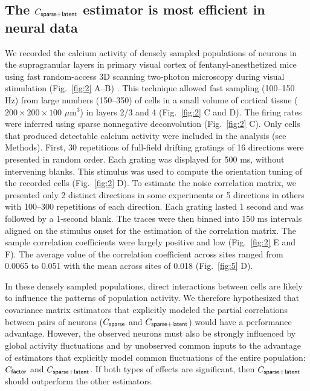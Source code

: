 \subsection*{The $C_{\sf sparse+latent}$ estimator is most efficient in neural data}
We recorded the calcium activity of densely sampled populations of neurons in the supragranular layers in primary visual cortex of fentanyl-anesthetized mice using fast random-access 3D scanning two-photon microscopy during visual stimulation (Fig.~\ref{fig:2} A--B) \cite{Reddy:2005, Katona:2012, Cotton:2013}. This technique allowed fast sampling (100--150 Hz) from large numbers (150--350) of cells in a small volume of cortical tissue ($200\times200\times100$ $\mu$m$^3$) in layers 2/3 and 4 (Fig.~\ref{fig:2} C and D).  The firing rates were inferred using sparse nonnegative deconvolution \cite{Vogelstein:2010} (Fig.~\ref{fig:2} C). Only cells that produced detectable calcium activity were included in the analysis (see Methods).  First, 30 repetitions of full-field drifting gratings of 16 directions were presented in random order.  Each grating was displayed for 500 ms, without intervening blanks.  This stimulus was used to compute the orientation tuning of the recorded cells (Fig.~\ref{fig:2} D). To estimate the noise correlation matrix, we presented only 2 distinct directions in some experiments or 5 directions in others with 100--300 repetitions of each direction. Each grating lasted 1 second and was followed by a 1-second blank.  The traces were then binned into 150 ms intervals aligned on the stimulus onset for the estimation of the correlation matrix.   The sample correlation coefficients were largely positive and low (Fig.~\ref{fig:2} E and F). The average value of the correlation coefficient across sites ranged from 0.0065 to 0.051 with the mean across sites of 0.018 (Fig.~\ref{fig:5} D).

In these densely sampled populations, direct interactions between cells are likely to influence the patterns of population activity.  We therefore hypothesized that covariance matrix estimators that explicitly modeled the partial correlations between pairs of neurons ($C_{\sf sparse}$ and $C_{\sf sparse+latent}$) would have a performance advantage.  However, the observed neurons must also be strongly influenced by global activity fluctuations and by unobserved common inputs to the advantage of estimators that explicitly model common fluctuations of the entire population: $C_{\sf factor}$ and $C_{\sf sparse+latent}$.  If both types of effects are significant, then $C_{\sf sparse+latent}$ should outperform the other estimators.

